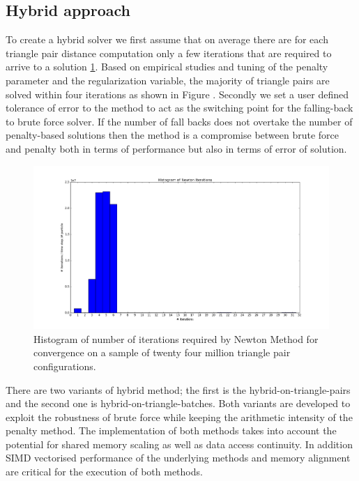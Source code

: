 \subsection{Hybrid approach}
To create a hybrid solver we first assume that on average there are for each triangle pair distance computation only a few iterations that are required to arrive to a solution \ref{figure:newton_hist}. Based on empirical studies and tuning of the penalty parameter and the regularization variable, the majority of triangle pairs are solved within four iterations as shown in Figure {}. Secondly we set a user defined tolerance of error to the method to act as the switching point for the falling-back to brute force solver. If the number of fall backs does not overtake the number of penalty-based solutions then the method is a compromise between brute force and penalty both in terms of performance but also in terms of error of solution. 

\begin{figure}[htb]
  \begin{center}
    \includegraphics[width=1\textwidth]{experiments/random/penalty-stats/bar.png}
  \end{center}
  \caption{Histogram of number of iterations required by Newton Method for convergence on a sample of twenty four million triangle pair configurations.}
  \label{figure:newton_hist}
\end{figure}

There are two variants of hybrid method; the first is the hybrid-on-triangle-pairs and the second one is hybrid-on-triangle-batches. Both variants are developed to exploit the robustness of brute force while keeping the arithmetic intensity of the penalty method. The implementation of both methods takes into account the potential for shared memory scaling as well as data access continuity. In addition SIMD vectorised performance of the underlying methods and memory alignment are critical for the execution of both methods.


